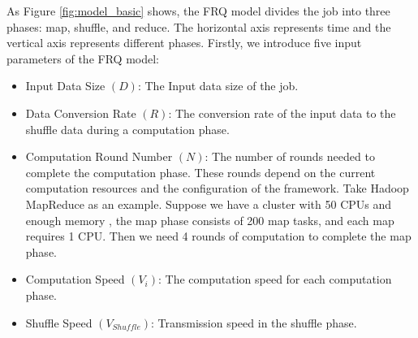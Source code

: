 {{%
As Figure \ref{fig:model_basic} shows, the FRQ model divides the job into three phases: map, shuffle, and reduce.
The horizontal axis represents time and the vertical axis represents different phases.
Firstly, we introduce five input parameters of the FRQ model:
}
\begin{itemize}
	\item Input Data Size \((D)\): The  Input data size of the job.
	\item Data Conversion Rate \((R)\): The conversion rate of the input data to the shuffle data during a computation phase.
    \item Computation Round Number \((N)\): The number of rounds needed to complete the computation phase. These rounds depend on the current computation resources and the configuration of the framework. Take Hadoop MapReduce as an example. Suppose we have a cluster with 50 CPUs and enough memory , the map phase consists of 200 map tasks, and each map requires 1 CPU. Then we need 4 rounds of computation to complete the map phase.
    \item Computation Speed \((V_{i})\): 
	The computation speed for each computation phase.
    \item Shuffle Speed \((V_{Shuffle})\): 
	Transmission speed in the shuffle phase.
\end{itemize}

}
